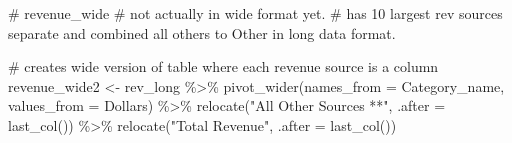 \documentclass[
  letterpaper,
  DIV=11,
  numbers=noendperiod]{scrreport}
\newenvironment{Shaded}{\begin{snugshade}}{\end{snugshade}}
\newcommand{\AttributeTok}[1]{\textcolor[rgb]{0.40,0.45,0.13}{#1}}
\newcommand{\CommentTok}[1]{\textcolor[rgb]{0.37,0.37,0.37}{#1}}
\newcommand{\FunctionTok}[1]{\textcolor[rgb]{0.28,0.35,0.67}{#1}}
\newcommand{\NormalTok}[1]{\textcolor[rgb]{0.00,0.23,0.31}{#1}}
\newcommand{\OtherTok}[1]{\textcolor[rgb]{0.00,0.23,0.31}{#1}}
\newcommand{\SpecialCharTok}[1]{\textcolor[rgb]{0.37,0.37,0.37}{#1}}
\newcommand{\StringTok}[1]{\textcolor[rgb]{0.13,0.47,0.30}{#1}}
\begin{document}
\begin{Shaded}
\begin{Highlighting}[]
\CommentTok{\# revenue\_wide \# not actually in wide format yet. }
\CommentTok{\# has 10 largest rev sources separate and combined all others to Other in long data format. }


\CommentTok{\# creates wide version of table where each revenue source is a column}
\NormalTok{revenue\_wide2 }\OtherTok{\textless{}{-}}\NormalTok{ rev\_long }\SpecialCharTok{\%\textgreater{}\%} \FunctionTok{pivot\_wider}\NormalTok{(}\AttributeTok{names\_from =}\NormalTok{ Category\_name, }
              \AttributeTok{values\_from =}\NormalTok{ Dollars) }\SpecialCharTok{\%\textgreater{}\%}
  \FunctionTok{relocate}\NormalTok{(}\StringTok{"All Other Sources **"}\NormalTok{, }\AttributeTok{.after =} \FunctionTok{last\_col}\NormalTok{()) }\SpecialCharTok{\%\textgreater{}\%}
  \FunctionTok{relocate}\NormalTok{(}\StringTok{"Total Revenue"}\NormalTok{, }\AttributeTok{.after =}  \FunctionTok{last\_col}\NormalTok{())}



\end{Highlighting}
\end{Shaded}
\end{document}
